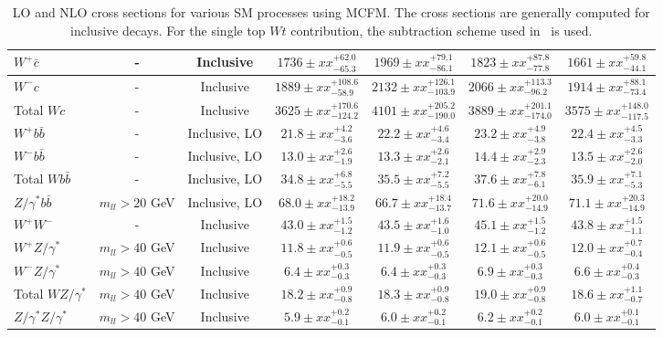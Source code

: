 \begin{table}[hbt]
\begin{center}
{\begin{tabular}{|l|c|c|c|c|c|c|}
$W^+ \bar{c}$ & - & Inclusive & $1736 \pm xx ^{+62.0}_{-65.3}$ & $1969 \pm xx ^{+79.1}_{-86.1}$ & $1823 \pm xx ^{+87.8}_{-77.8}$ & $1661 \pm xx ^{+59.8}_{-44.1}$ \\ \hline
$W^- c$ & - & Inclusive & $1889 \pm xx ^{+108.6}_{-58.9}$ & $2132 \pm xx ^{+126.1}_{-103.9}$ & $2066 \pm xx ^{+113.3}_{-96.2}$ & $1914 \pm xx ^{+88.1}_{-73.4}$ \\ \hline
Total $Wc$ & - & Inclusive & $3625 \pm xx ^{+170.6}_{-124.2}$ & $4101 \pm xx ^{+205.2}_{-190.0}$ & $3889 \pm xx ^{+201.1}_{-174.0}$ & $3575 \pm xx ^{+148.0}_{-117.5}$  \\ \hline
$W^+ b\bar{b}$ & - & Inclusive, LO & $21.8 \pm xx ^{+4.2}_{-3.6}$ & $22.2 \pm xx ^{+4.6}_{-3.4}$ & $23.2 \pm xx ^{+4.9}_{-3.8}$ & $22.4 \pm xx ^{+4.5}_{-3.3}$ \\ \hline
$W^- b\bar{b}$ & - & Inclusive, LO & $13.0 \pm xx ^{+2.6}_{-1.9}$ & $13.3 \pm xx ^{+2.6}_{-2.1}$ & $14.4 \pm xx ^{+2.9}_{-2.3}$ & $13.5 \pm xx ^{+2.6}_{-2.0}$ \\ \hline
Total $Wb\bar{b}$ & - & Inclusive, LO & $34.8 \pm xx ^{+6.8}_{-5.5}$ & $35.5 \pm xx ^{+7.2}_{-5.5}$ & $37.6 \pm xx ^{+7.8}_{-6.1}$ & $35.9 \pm xx ^{+7.1}_{-5.3}$  \\ \hline
$Z/\gamma^* b\bar{b}$ & $m_{ll} > 20$ GeV & Inclusive, LO & $68.0 \pm xx ^{+18.2}_{-13.9}$ & $66.7 \pm xx ^{+18.4}_{-13.7}$ & $71.6 \pm xx ^{+20.0}_{-14.9}$ & $71.1 \pm xx ^{+20.3}_{-14.9}$ \\ \hline
$W^+W^-$ & - & Inclusive & $43.0 \pm xx ^{+1.5}_{-1.2}$ & $43.5 \pm xx ^{+1.6}_{-1.0}$ & $45.1 \pm xx ^{+1.5}_{-1.2}$ & $43.8 \pm xx ^{+1.5}_{-1.1}$ \\ \hline
$W^+Z/\gamma^*$ & $m_{ll} > 40$ GeV & Inclusive & $11.8 \pm xx ^{+0.6}_{-0.5}$ & $11.9 \pm xx ^{+0.6}_{-0.5}$ & $12.1 \pm xx ^{+0.6}_{-0.5}$ & $12.0 \pm xx ^{+0.7}_{-0.4}$ \\ \hline
$W^-Z/\gamma^*$ & $m_{ll} > 40$ GeV & Inclusive & $6.4 \pm xx ^{+0.3}_{-0.3}$ & $6.4 \pm xx ^{+0.3}_{-0.3}$ & $6.9 \pm xx ^{+0.3}_{-0.3}$ & $6.6 \pm xx ^{+0.4}_{-0.3}$ \\ \hline
Total $WZ/\gamma^*$ & $m_{ll} > 40$ GeV & Inclusive & $18.2 \pm xx ^{+0.9}_{-0.8}$ & $18.3 \pm xx ^{+0.9}_{-0.8}$ & $19.0 \pm xx ^{+0.9}_{-0.8}$ & $18.6 \pm xx ^{+1.1}_{-0.7}$  \\ \hline
$Z/\gamma^*Z/\gamma^*$ & $m_{ll} > 40$ GeV & Inclusive & $5.9 \pm xx ^{+0.2}_{-0.1}$ & $6.0 \pm xx ^{+0.2}_{-0.1}$ & $6.2 \pm xx ^{+0.2}_{-0.1}$ & $6.0 \pm xx ^{+0.1}_{-0.1}$ \\ \hline
\end{tabular} }
\caption{LO and NLO cross sections for various SM processes using MCFM. The cross sections are generally
computed for inclusive decays. For the single top $Wt$ contribution, the subtraction scheme
used in~\cite{Wtsubscheme} is used. \label{tab:nlo}}
\end{center}
\end{table}


